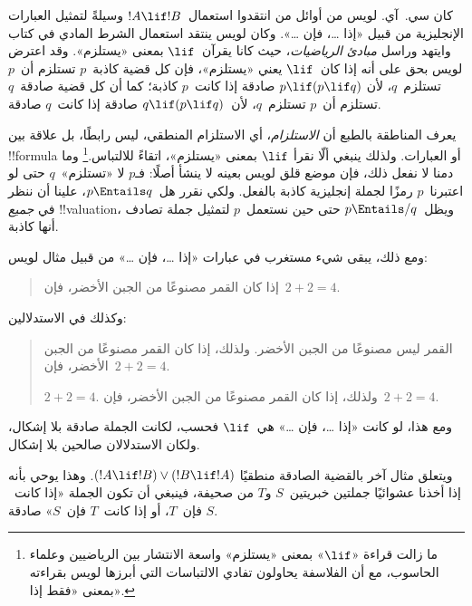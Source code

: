 \documentclass[../../../include/open-logic-section]{subfiles}
\begin{document}


كان سي.~آي. لويس من أوائل من انتقدوا استعمال~$!A \lif !B$ وسيلةً
لتمثيل العبارات الإنجليزية من قبيل «إذا \dots، فإن \dots». وكان لويس
ينتقد استعمال الشرط المادي في كتاب وايتهد وراسل
\emph{مبادئ الرياضيات}، حيث كانا يقرآن~$\lif$ بمعنى «يستلزم».
وقد اعترض لويس بحق على أنه إذا كان~$\lif$ يعني «يستلزم»، فإن كل
قضية كاذبة~$p$ تستلزم أن~$p$ تستلزم~$q$، لأن
$p \lif (p \lif q)$ صادقة إذا كانت~$p$ كاذبة؛ كما أن كل قضية صادقة~$q$
تستلزم أن~$p$ تستلزم~$q$، لأن~$q \lif (p \lif q)$ صادقة إذا كانت~$q$
صادقة.

يعرف المناطقة بالطبع أن \emph{الاستلزام}، أي الاستلزام المنطقي، ليس
رابطًا، بل علاقة بين !!{formula} أو العبارات. ولذلك ينبغي ألّا نقرأ
$\lif$ بمعنى «يستلزم»، اتقاءً للالتباس.\footnote{ما زالت قراءة
  «$\lif$» بمعنى «يستلزم» واسعة الانتشار بين الرياضيين وعلماء الحاسوب،
  مع أن الفلاسفة يحاولون تفادي الالتباسات التي أبرزها لويس بقراءته
  بمعنى «فقط إذا».} وما دمنا لا نفعل ذلك، فإن موضع قلق لويس بعينه لا
ينشأ أصلًا: فـ$p$ لا «تستلزم»~$q$ حتى لو اعتبرنا~$p$ رمزًا لجملة
إنجليزية كاذبة بالفعل. ولكي نقرر هل~$p \Entails q$، علينا أن ننظر في
\emph{جميع} !!{valuation}، ويظل~$p \Entails/ q$ حتى حين نستعمل~$p$
لتمثيل جملة تصادف أنها كاذبة.

ومع ذلك، يبقى شيء مستغرب في عبارات «إذا \dots، فإن \dots» من قبيل
مثال لويس:
\begin{quote}
إذا كان القمر مصنوعًا من الجبن الأخضر، فإن~$2+2=4$.
\end{quote}
وكذلك في الاستدلالين:
\begin{quote}
  القمر ليس مصنوعًا من الجبن الأخضر. ولذلك، إذا كان القمر مصنوعًا
  من الجبن الأخضر، فإن~$2+2=4$.

  $2+2 = 4$. ولذلك، إذا كان القمر مصنوعًا
  من الجبن الأخضر، فإن~$2+2=4$.
\end{quote}
ومع هذا، لو كانت «إذا \dots، فإن \dots» هي~$\lif$ فحسب، لكانت الجملة
صادقة بلا إشكال، ولكان الاستدلالان صالحين بلا إشكال.

ويتعلق مثال آخر بالقضية الصادقة منطقيًا
$(!A \lif !B) \lor (!B \lif !A)$. وهذا يوحي بأنه إذا أخذنا عشوائيًا
جملتين خبريتين~$S$ و$T$ من صحيفة، فينبغي أن تكون الجملة «إذا كانت~$S$
فإن~$T$، أو إذا كانت~$T$ فإن~$S$» صادقة.
\end{document}
